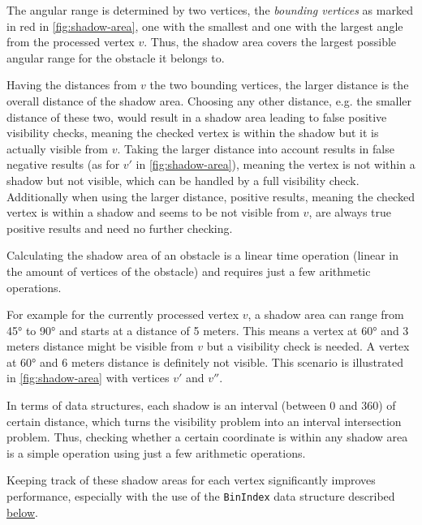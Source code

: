 		The angular range is determined by two vertices, the \emph{bounding vertices} as marked in red in \cref{fig:shadow-area}, one with the smallest and one with the largest angle from the processed vertex $v$.
		Thus, the shadow area covers the largest possible angular range for the obstacle it belongs to.
		
		Having the distances from $v$ the two bounding vertices, the larger distance is the overall distance of the shadow area.
		Choosing any other distance, e.g. the smaller distance of these two, would result in a shadow area leading to false positive visibility checks, meaning the checked vertex is within the shadow but it is actually visible from $v$.
		Taking the larger distance into account results in false negative results (as for $v'$ in \cref{fig:shadow-area}), meaning the vertex is not within a shadow but not visible, which can be handled by a full visibility check.
		Additionally when using the larger distance, positive results, meaning the checked vertex is within a shadow and seems to be not visible from $v$, are always true positive results and need no further checking.
		
		Calculating the shadow area of an obstacle is a linear time operation (linear in the amount of vertices of the obstacle) and requires just a few arithmetic operations.
		
		For example for the currently processed vertex $v$, a shadow area can range from 45° to 90° and starts at a distance of 5 meters.
		This means a vertex at 60° and 3 meters distance might be visible from $v$ but a visibility check is needed.
		A vertex at 60° and 6 meters distance is definitely not visible.
		This scenario is illustrated in \cref{fig:shadow-area} with vertices $v'$ and $v''$.
		
		In terms of data structures, each shadow is an interval (between 0 and 360) of certain distance, which turns the visibility problem into an interval intersection problem.
		Thus, checking whether a certain coordinate is within any shadow area is a simple operation using just a few arithmetic operations.
		
		Keeping track of these shadow areas for each vertex significantly improves performance, especially with the use of the \texttt{BinIndex} data structure described \hyperref[subsec:binindex]{below}.
		
		
